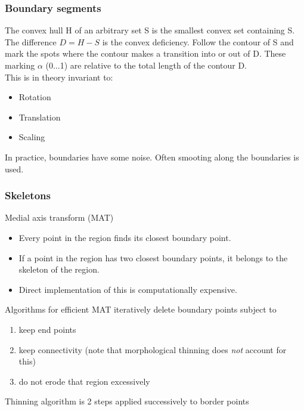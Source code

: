 \subsubsection{Boundary segments}
The convex hull H of an arbitrary set S is the smallest convex set containing S. The difference $D=H-S$ is the convex deficiency. Follow the contour of S and mark the spots where the contour makes a transition into or out of D. These marking $\alpha$ (0...1) are relative to the total length of the contour D.\\
This is in theory invariant to:\\
\begin{itemize}
\item Rotation
\item Translation
\item Scaling
\end{itemize}
In practice, boundaries have some noise. Often smooting along the boundaries is used.\\
\subsubsection{Skeletons}
Medial axis transform (MAT)
\begin{itemize}
\item Every point in the region finds its closest boundary point.
\item If a point in the region has two closest boundary points, it belongs to the skeleton of the region.
\item Direct implementation of this is computationally expensive.
\end{itemize}
Algorithms for efficient MAT iteratively delete boundary points subject to
\begin{enumerate}
\item keep end points
\item keep connectivity (\small note that morphological thinning does \emph{not} account for this)
\item do not erode that region excessively
\end{enumerate}
Thinning algorithm is 2 steps applied successively to border points\\
\\
